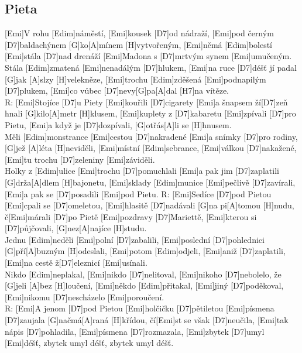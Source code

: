 \documentclass[10pt]{article}
\begin{document}
\begin{Large}
\begin{minipage}{\textwidth}
\subsection{Pieta}
\begin{multicols}{2}
\begin{guitar}
	[Emi  Edim  Emi  H7]
	
	[Emi]V rohu [Edim]náměstí, [Emi]kousek [D7]od nádraží,
	[Emi]pod černým [D7]baldachýnem [G]ko[A]mínem 
	[H]vytvořeným,
	[Emi]němá [Edim]bolestí [Emi]stála [D7]nad drenáží
	[Emi]Madona s [D7]mrtvým synem [Emi]umučeným.
	\\
	[Emi]Stála [Edim]zmatená [Emi]nenadálým [D7]hlukem,
	[Emi]na ruce [D7]déšť jí padal [G]jak [A]slzy [H]velekněze,
	[Emi]trochu [Edim]zděšená [Emi]podnapilým [D7]plukem,
	[Emi]co vůbec [D7]nevy[G]pa[A]dal [H7]na vítěze.
	\\
	R: [Emi]Stojíce [D7]u Piety [Emi]kouřili [D7]cigarety
	[Emi]a šnapsem ží[D7]zeň hnali [G]kilo[A]metr [H]klusem,
	[Emi]kuplety z [D7]kabaretu [Emi]zpívali [D7]pro Pietu,
	[Emi]a když je [D7]dozpívali, [G]otřás[A]li se [H]hnusem.
	\\
	[Emi]Měli [Edim]monstrance [Emi]cestou [D7]nakradené
	[Emi]a snímky [D7]pro rodiny, [G]jež [A]léta [H]neviděli,
	[Emi]místní [Edim]sebrance, [Emi]válkou [D7]nakažené,
	[Emi]tu trochu [D7]zeleniny [Emi]záviděli.
	\\
	[Emi]Holky z [Edim]ulice [Emi]trochu [D7]pomuchlali
	[Emi]a pak jim [D7]zaplatili [G]drža[A]dlem [H]bajonetu,
	[Emi]sklady [Edim]munice [Emi]pečlivě [D7]zavírali,
	[Emi]a pak se [D7]posadili [Emi]pod Pietu.
	\columnbreak
	R: [Emi]Sedíce [D7]pod Pietou [Emi]cpali se [D7]omeletou,
	[Emi]hlasitě [D7]nadávali [G]na pi[A]tomou [H]nudu,
	č[Emi]márali [D7]po Pietě [Emi]pozdravy [D7]Mariettě,
	[Emi]kterou si [D7]půjčovali, [G]nez[A]najíce [H]studu.
	\\
	[Emi]Jednu [Edim]neděli [Emi]polní [D7]zabalili,
	[Emi]poslední [D7]pohlednici [G]pří[A]buzným [H]odeslali,
	[Emi]potom [Edim]odjeli, [Emi]aniž [D7]zaplatili,
	[Emi]na cestě ž[D7]eleznicí [Emi]usínali.
	\\
	[Emi]Nikdo [Edim]neplakal, [Emi]nikdo [D7]nelitoval,
	[Emi]nikoho [D7]nebolelo, že [G]jeli [A]bez [H]loučení,
	[Emi]někdo [Edim]přitakal, [Emi]jiný [D7]poděkoval,
	[Emi]nikomu [D7]nescházelo [Emi]poroučení.
	\\
	R: [Emi]A jenom [D7]pod Pietou [Emi]holčičku [D7]pětiletou
	[Emi]písmena [D7]zaujala [G]načmá[A]raná [H]křídou,
	čí[Emi]st se však [D7]neučila, [Emi]tak nápis [D7]pohladila,
	[Emi]písmena [D7]rozmazala, [Emi]zbytek [D7]umyl [Emi]déšť,
	zbytek umyl déšť, zbytek umyl déšť.
\end{guitar}
\end{multicols}
\end{minipage}


\end{Large}
\end{document}
